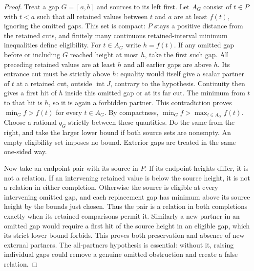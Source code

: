 \begin{proof}
Treat a gap $G=[a,b]$ and sources to its left first.  Let $A_G$ consist of
$t\in P$ with $t<a$ such that all retained values between $t$ and $a$
are at least $f(t)$, ignoring the omitted gaps.  This set is compact:
$P$ stays a positive distance from the retained cuts, and finitely many
continuous retained-interval minimum inequalities define eligibility.
For $t\in A_G$ write $h=f(t)$.  If any omitted gap before or including
$G$ reached height at most $h$, take the first such gap.  All preceding
retained values are at least $h$ and all earlier gaps are above $h$.
Its entrance cut must be strictly above $h$: equality would itself give
a scalar partner of $t$ at a retained cut, outside
$\operatorname{int}J$, contrary to the hypothesis.  Continuity then
gives a first hit of $h$ inside this omitted gap or at its far cut.  The
minimum from $t$ to that hit is $h$, so it is again a forbidden partner.
This contradiction proves $\min_G f>f(t)$ for every $t\in A_G$.
By compactness, $\min_G f>\max_{t\in A_G}f(t)$.  Choose a rational
$q_G$ strictly between these quantities.  Do the same from the right,
and take the larger lower bound if both source sets are nonempty.
An empty eligibility set imposes no bound.  Exterior gaps are treated
in the same one-sided way.

Now take an endpoint pair with its source in $P$.  If its endpoint
heights differ, it is not a relation.  If an intervening retained value
is below the source height, it is not a relation in either completion.
Otherwise the source is eligible at every intervening omitted gap, and
each replacement gap has minimum above its source height by the bounds
just chosen.  Thus the pair is a relation in both completions exactly
when its retained comparisons permit it.  Similarly a new partner in
an omitted gap would require a first hit of the source height in an
eligible gap, which its strict lower bound forbids.  This proves both
preservation and absence of new external partners.  The all-partners
hypothesis is essential: without it, raising individual gaps could
remove a genuine omitted obstruction and create a false relation.
\end{proof}

